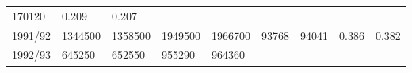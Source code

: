 \documentclass[
  spanish,
]{article}
\begin{document}
\begin{longtable}[]{@{}lllllllll@{}}
\begin{minipage}[t]{0.09\columnwidth}
170120\strut
\end{minipage} & \begin{minipage}[t]{0.08\columnwidth}\raggedright
0.209\strut
\end{minipage} & \begin{minipage}[t]{0.09\columnwidth}\raggedright
0.207\strut
\end{minipage}\tabularnewline
\begin{minipage}[t]{0.06\columnwidth}\raggedright
1991/92\strut
\end{minipage} & \begin{minipage}[t]{0.09\columnwidth}\raggedright
1344500\strut
\end{minipage} & \begin{minipage}[t]{0.10\columnwidth}\raggedright
1358500\strut
\end{minipage} & \begin{minipage}[t]{0.09\columnwidth}\raggedright
1949500\strut
\end{minipage} & \begin{minipage}[t]{0.10\columnwidth}\raggedright
1966700\strut
\end{minipage} & \begin{minipage}[t]{0.08\columnwidth}\raggedright
93768\strut
\end{minipage} & \begin{minipage}[t]{0.09\columnwidth}\raggedright
94041\strut
\end{minipage} & \begin{minipage}[t]{0.08\columnwidth}\raggedright
0.386\strut
\end{minipage} & \begin{minipage}[t]{0.09\columnwidth}\raggedright
0.382\strut
\end{minipage}\tabularnewline
\begin{minipage}[t]{0.06\columnwidth}\raggedright
1992/93\strut
\end{minipage} & \begin{minipage}[t]{0.09\columnwidth}\raggedright
645250\strut
\end{minipage} & \begin{minipage}[t]{0.10\columnwidth}\raggedright
652550\strut
\end{minipage} & \begin{minipage}[t]{0.09\columnwidth}\raggedright
955290\strut
\end{minipage} & \begin{minipage}[t]{0.10\columnwidth}\raggedright
964360\strut
\end{minipage} & \begin{minipage}[t]{0.08\columnwidth}\raggedright

\end{minipage}
\end{longtable}
\end{document}
